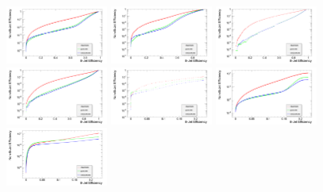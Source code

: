 \begin{figure}[hbtp]
   \centering
     \includegraphics[width=0.3\textwidth]{Chapters/06_BTag_Study/Images/TrackCountingHighEfficiency_nonBJetEfficiency_v_bJetEfficiency}\hfill
     \includegraphics[width=0.3\textwidth]{Chapters/06_BTag_Study/Images/TrackCountingHighPurity_nonBJetEfficiency_v_bJetEfficiency}\hfill
     \includegraphics[width=0.3\textwidth]{Chapters/06_BTag_Study/Images/JetProbability_nonBJetEfficiency_v_bJetEfficiency}\\
     \includegraphics[width=0.3\textwidth]{Chapters/06_BTag_Study/Images/JetBProbability_nonBJetEfficiency_v_bJetEfficiency}\hfill
     \includegraphics[width=0.3\textwidth]{Chapters/06_BTag_Study/Images/SoftMuon_nonBJetEfficiency_v_bJetEfficiency}\hfill
     \includegraphics[width=0.3\textwidth]{Chapters/06_BTag_Study/Images/SoftMuonByIP3d_nonBJetEfficiency_v_bJetEfficiency}\\
     \includegraphics[width=0.3\textwidth]{Chapters/06_BTag_Study/Images/SoftMuonByPt_nonBJetEfficiency_v_bJetEfficiency}\hfill

\end{figure}
